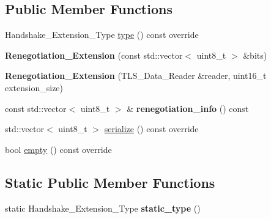 \subsection*{Public Member Functions}
\begin{DoxyCompactItemize}
\item 
Handshake\+\_\+\+Extension\+\_\+\+Type \hyperlink{class_botan_1_1_t_l_s_1_1_renegotiation___extension_a68950eaadf339a1c739e044e9fdff665}{type} () const override
\item 
\mbox{\label{class_botan_1_1_t_l_s_1_1_renegotiation___extension_a1a461eaa73abd486c77998260344a39e}} 
{\bfseries Renegotiation\+\_\+\+Extension} (const std\+::vector$<$ uint8\+\_\+t $>$ \&bits)
\item 
\mbox{\label{class_botan_1_1_t_l_s_1_1_renegotiation___extension_aa0723525704d44b406f92f8dca869c0a}} 
{\bfseries Renegotiation\+\_\+\+Extension} (T\+L\+S\+\_\+\+Data\+\_\+\+Reader \&reader, uint16\+\_\+t extension\+\_\+size)
\item 
\mbox{\label{class_botan_1_1_t_l_s_1_1_renegotiation___extension_a8e82ff1913222c6af44fdeae53e63816}} 
const std\+::vector$<$ uint8\+\_\+t $>$ \& {\bfseries renegotiation\+\_\+info} () const
\item 
std\+::vector$<$ uint8\+\_\+t $>$ \hyperlink{class_botan_1_1_t_l_s_1_1_renegotiation___extension_a711f6f2ba21e408a00d81fe1bc98751b}{serialize} () const override
\item 
bool \hyperlink{class_botan_1_1_t_l_s_1_1_renegotiation___extension_a3e8751e4089301b3d9b39e7e2028573e}{empty} () const override
\end{DoxyCompactItemize}
\subsection*{Static Public Member Functions}
\begin{DoxyCompactItemize}
\item 
\mbox{\label{class_botan_1_1_t_l_s_1_1_renegotiation___extension_aead75994d58716663c90f9c2dbf2cbf0}} 
static Handshake\+\_\+\+Extension\+\_\+\+Type {\bfseries static\+\_\+type} ()
\end{DoxyCompactItemize}


